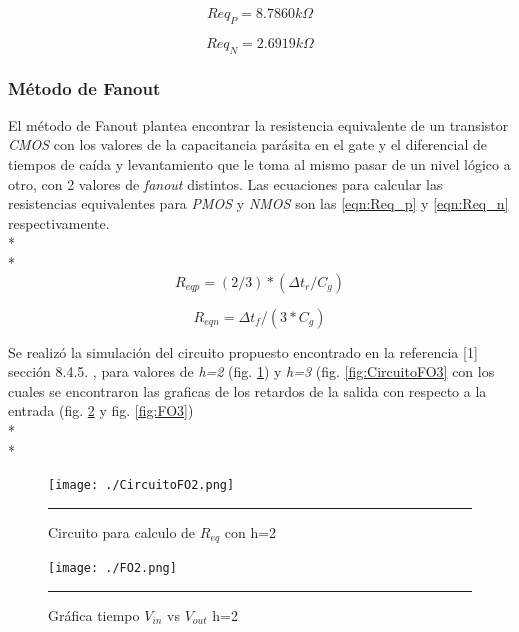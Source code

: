 \documentclass[12pt,a4paper]{article} %
\begin{document}
\begin{equation}\label{eqn:R_PMOS}
Req_P = 8.7860k\Omega
\end{equation}

\begin{equation}\label{eqn:R_NMOS}
Req_N = 2.6919k\Omega
\end{equation}

\subsubsection{Método de Fanout}

El método de Fanout plantea encontrar la resistencia equivalente de un transistor \textit{CMOS} con los valores de la capacitancia parásita en el gate y el diferencial de tiempos de caída y levantamiento que le toma al mismo pasar de un nivel lógico a otro, con 2 valores de \textit{fanout} distintos. Las ecuaciones para calcular las resistencias equivalentes para \textit{PMOS} y \textit{NMOS} son las \ref{eqn:Req_p} y \ref{eqn:Req_n} respectivamente.\\*
\\*
\begin{equation}\label{eqn:Req_p}
R_{eqp}=(2/3)*( \Delta t_{r}/C_{g})
\end{equation}

\begin{equation}\label{eqn:Req_n}
R_{eqn}= \Delta t_{f}/(3*C_{g})
\end{equation}

Se realizó la simulación del circuito propuesto encontrado en la referencia [1] sección 8.4.5. , para valores de \textit{h=2} (fig. \ref{fig:CircuitoFO2}) y \textit{h=3} (fig. \ref{fig:CircuitoFO3} con los cuales se encontraron las graficas de los retardos de la salida con respecto a la entrada (fig. \ref{fig:FO2} y fig. \ref{fig:FO3})\\*
\\*
\begin{figure}[htbp]
\begin{center}
    \texttt{[image: ./CircuitoFO2.png]}
    \rule{35em}{0.5pt}
  \caption[Captura]{Circuito para calculo de $R_{eq}$ con h=2}
  \label{fig:CircuitoFO2}
  \end{center}
\end{figure}

\begin{figure}[htbp]
  \centering
    \texttt{[image: ./FO2.png]}
    \rule{35em}{1pt}
  \caption[Captura]{Gráfica tiempo $V_{in}$ vs $V_{out}$ h=2}
  \label{fig:FO2}
\end{figure}
\end{document}
